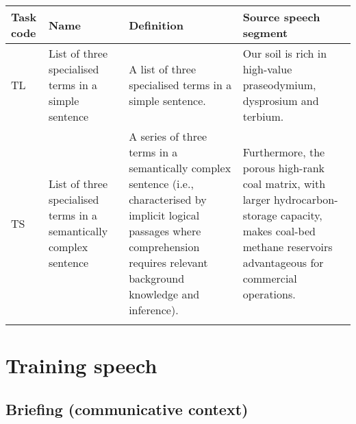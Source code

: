 \begin{sidewaystable}
\small
\begin{tabularx}{\textwidth}{l>{\raggedright\arraybackslash}p{}QQ}
\midrule
{Task code} & {Name}    & {Definition}   & {Source speech segment}       \\ \midrule
TL                 & List of three specialised terms in a simple sentence                 & A list of three specialised terms in a simple sentence.                                                                                                                                                                                                                                                                                                                                                          & Our soil is rich in high-value  praseodymium, dysprosium and terbium.                                                                                                                                                                                                            \\\tablevspace
TS                 & List of three specialised terms in a semantically complex sentence & A series of three terms in a semantically  complex sentence (i.e., characterised by implicit logical passages where comprehension requires relevant background knowledge and inference).                                                                                                                                                                                                                    & Furthermore, the porous high-rank coal  matrix, with larger hydrocarbon-storage  capacity, makes coal-bed methane  reservoirs advantageous for commercial  operations.                                                                                                     \\ \lspbottomrule

\end{tabularx}
\end{sidewaystable}





\chapter{Training speech}


\section{Briefing (communicative context)}


